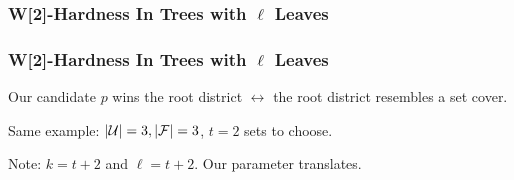 \begin{frame}[t]
    \frametitle{W[2]-Hardness In Trees with $\ell$ Leaves}

    \begin{figure}
		\begin{center}
			
		\end{center}
	\end{figure}

    \begin{figure}
		\begin{center}
			
		\end{center}
	\end{figure}
\end{frame}

\begin{frame}
    \frametitle{W[2]-Hardness In Trees with $\ell$ Leaves}
    \begin{itemize}
        \item Our candidate $p$ wins the root district $\leftrightarrow$ the root district resembles a set cover.
         {
            \item Same example: $|\mathcal{U}| = 3, |\mathcal{F}| = 3$, $t = 2$ sets to choose.
        }
         {
            \item Note: $k=t+2$ and $\ell = t+2$. Our parameter translates.
        }
    \end{itemize}

    \begin{figure}
		\begin{center}
			
		\end{center}
	\end{figure}
\end{frame}